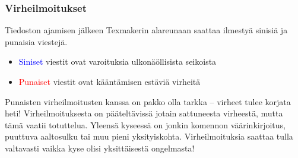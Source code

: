 \begin{fframe}
    \frametitle{Virheilmoitukset}
    Tiedoston ajamisen jälkeen Texmakerin alareunaan saattaa ilmestyä sinisiä ja punaisia viestejä.\pause
    \begin{itemize}[<+->]
        \item \textcolor{blue}{Siniset} viestit ovat varoituksia ulkonäöllisista seikoista
        \item \textcolor{red}{Punaiset} viestit ovat kääntämisen estäviä virheitä
    \end{itemize}\pause
    Punaisten virheilmoitusten kanssa on pakko olla tarkka -- virheet tulee korjata heti!
    \vaihto
    \pause
    Virheilmoituksesta on pääteltävissä jotain sattuneesta virheestä, mutta tämä vaatii totuttelua. 
    \pause Yleensä kyseessä on jonkin komennon väärinkirjoitus, puuttuva aaltosulku tai muu pieni yksityiskohta.
    \vaihto
    \pause Virheilmoituksia saattaa tulla valtavasti vaikka kyse olisi yksittäisestä ongelmasta!
\end{fframe}


